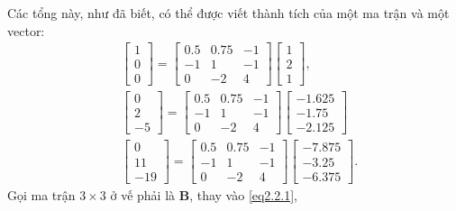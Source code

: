 Các tổng này, như đã biết, có thể được viết thành tích của một ma trận và một vector:
\begin{align*}
    &\begin{bmatrix}
        1\\0\\0
    \end{bmatrix}=\begin{bmatrix}
        0.5 & 0.75 & -1\\
        -1 & 1 & -1\\
        0 & -2 & 4
    \end{bmatrix}\begin{bmatrix} 1\\2\\1\end{bmatrix},\\
&\begin{bmatrix}
    0\\2\\-5
\end{bmatrix}=\begin{bmatrix}
    0.5 & 0.75 & -1\\
    -1 & 1 & -1\\
    0 & -2 & 4
\end{bmatrix}\begin{bmatrix}
    -1.625\\-1.75\\-2.125
\end{bmatrix}\\
&\begin{bmatrix}
    0\\11\\-19
\end{bmatrix}=\begin{bmatrix}
    0.5 & 0.75 & -1\\
    -1 & 1 & -1\\
    0 & -2 & 4
\end{bmatrix}\begin{bmatrix}
    -7.875\\-3.25\\-6.375
\end{bmatrix}.
\end{align*} Gọi ma trận \(3\times 3\) ở vế phải là \(\mathbf{B}\), thay vào \eqref{eq2.2.1},
